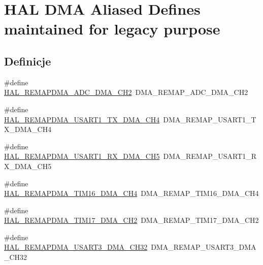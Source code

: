 \hypertarget{group___h_a_l___d_m_a___aliased___defines}{}\section{H\+AL D\+MA Aliased Defines maintained for legacy purpose}
\label{group___h_a_l___d_m_a___aliased___defines}
\subsection*{Definicje}
\begin{DoxyCompactItemize}
\item 
\#define \hyperlink{group___h_a_l___d_m_a___aliased___defines_gab67dabe51720b5e84e798243b52428c7}{H\+A\+L\+\_\+\+R\+E\+M\+A\+P\+D\+M\+A\+\_\+\+A\+D\+C\+\_\+\+D\+M\+A\+\_\+\+C\+H2}~D\+M\+A\+\_\+\+R\+E\+M\+A\+P\+\_\+\+A\+D\+C\+\_\+\+D\+M\+A\+\_\+\+C\+H2
\item 
\#define \hyperlink{group___h_a_l___d_m_a___aliased___defines_ga9f990969f0752e658ca3b1ca5fef46b8}{H\+A\+L\+\_\+\+R\+E\+M\+A\+P\+D\+M\+A\+\_\+\+U\+S\+A\+R\+T1\+\_\+\+T\+X\+\_\+\+D\+M\+A\+\_\+\+C\+H4}~D\+M\+A\+\_\+\+R\+E\+M\+A\+P\+\_\+\+U\+S\+A\+R\+T1\+\_\+\+T\+X\+\_\+\+D\+M\+A\+\_\+\+C\+H4
\item 
\#define \hyperlink{group___h_a_l___d_m_a___aliased___defines_gaee098de174f870c95b0853e34dddd92b}{H\+A\+L\+\_\+\+R\+E\+M\+A\+P\+D\+M\+A\+\_\+\+U\+S\+A\+R\+T1\+\_\+\+R\+X\+\_\+\+D\+M\+A\+\_\+\+C\+H5}~D\+M\+A\+\_\+\+R\+E\+M\+A\+P\+\_\+\+U\+S\+A\+R\+T1\+\_\+\+R\+X\+\_\+\+D\+M\+A\+\_\+\+C\+H5
\item 
\#define \hyperlink{group___h_a_l___d_m_a___aliased___defines_ga4ff45d813656296b6f9226f333a22fc3}{H\+A\+L\+\_\+\+R\+E\+M\+A\+P\+D\+M\+A\+\_\+\+T\+I\+M16\+\_\+\+D\+M\+A\+\_\+\+C\+H4}~D\+M\+A\+\_\+\+R\+E\+M\+A\+P\+\_\+\+T\+I\+M16\+\_\+\+D\+M\+A\+\_\+\+C\+H4
\item 
\#define \hyperlink{group___h_a_l___d_m_a___aliased___defines_ga4f0dcd990b13d8fd3de0ed0bfd6be555}{H\+A\+L\+\_\+\+R\+E\+M\+A\+P\+D\+M\+A\+\_\+\+T\+I\+M17\+\_\+\+D\+M\+A\+\_\+\+C\+H2}~D\+M\+A\+\_\+\+R\+E\+M\+A\+P\+\_\+\+T\+I\+M17\+\_\+\+D\+M\+A\+\_\+\+C\+H2
\item 
\#define \hyperlink{group___h_a_l___d_m_a___aliased___defines_ga79d86fdf916efa7463e359ac4a404e29}{H\+A\+L\+\_\+\+R\+E\+M\+A\+P\+D\+M\+A\+\_\+\+U\+S\+A\+R\+T3\+\_\+\+D\+M\+A\+\_\+\+C\+H32}~D\+M\+A\+\_\+\+R\+E\+M\+A\+P\+\_\+\+U\+S\+A\+R\+T3\+\_\+\+D\+M\+A\+\_\+\+C\+H32

\end{DoxyCompactItemize}
